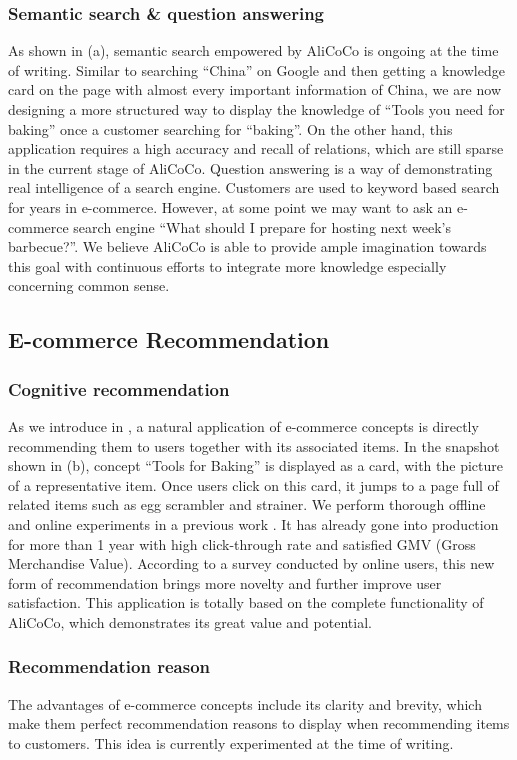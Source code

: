 \subsubsection{Semantic search \& question answering}
As shown in (a),
semantic search empowered by AliCoCo is ongoing at the time of writing. 
Similar to searching ``China'' on Google and then getting a knowledge card on the page with almost every important information of China, 
we are now designing a more structured way to display the knowledge of ``Tools you need for baking'' once a customer searching for ``baking''.
On the other hand, this application requires a high accuracy and recall of relations, which are still sparse in the current stage of AliCoCo.
Question answering is a way of demonstrating real intelligence of a search engine. 
Customers are used to keyword based search for years in e-commerce.
However, at some point we may want to ask an e-commerce search engine ``What should I prepare for hosting next week's barbecue?''. 
We believe AliCoCo is able to provide ample imagination towards this goal with continuous efforts to integrate more knowledge especially concerning common sense.

\subsection{E-commerce Recommendation}

\subsubsection{Cognitive recommendation}
As we introduce in ,
a natural application of e-commerce concepts is directly recommending them to users together with 
its associated items.
In the snapshot shown in (b), concept ``Tools for Baking'' is displayed as a card, with the picture of a representative item.
Once users click on this card, 
it jumps to a page full of related items such as egg scrambler and strainer.
We perform thorough offline and online experiments in a previous work
\cite{luo2019conceptualize}.
It has already gone into production for more than 1 year with high click-through rate and satisfied GMV (Gross Merchandise Value).
According to a survey conducted by online users, 
this new form of recommendation brings more novelty and further improve user satisfaction. 
This application is totally based on the complete functionality of AliCoCo, which demonstrates its great value and potential. 



\subsubsection{Recommendation reason}

The advantages of e-commerce concepts include its clarity and brevity, which make them perfect recommendation reasons to display when recommending items to customers.
This idea is currently experimented at the time of writing.


